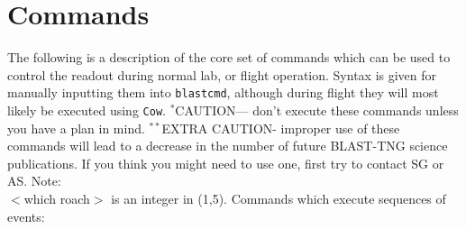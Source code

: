 \section{Commands}\label{commands}
The following is a description of the core set of commands which can be used to control the readout during normal lab, or flight operation. Syntax is given for manually inputting them into \texttt{blastcmd}, although during flight they will most likely be executed using \texttt{Cow}.
$^{*}$CAUTION--- don’t execute these commands unless you have a plan in mind.
$^{**}$EXTRA CAUTION- improper use of these commands will lead to a decrease in the number of future BLAST-TNG science publications. If you think you might need to use one, first try to contact SG or AS.
Note:\\
$<$which roach$>$ is an integer in (1,5).
Commands which execute sequences of events:

